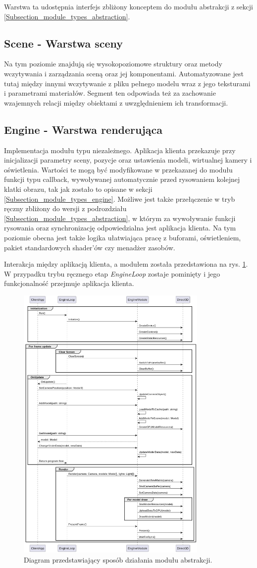 Warstwa ta udostępnia interfejs zbliżony konceptem do modułu abstrakcji z sekcji \ref{Subsection_module_types_abstraction}. 

\subsection{\textbf{Scene} - Warstwa sceny}
Na tym poziomie znajdują się wysokopoziomowe struktury oraz metody wczytywania i zarządzania sceną oraz jej komponentami. Automatyzowane jest tutaj między innymi wczytywanie z pliku pełnego modelu wraz z jego teksturami i parametrami materiałów. Segment ten odpowiada też za zachowanie wzajemnych relacji między obiektami z uwzględnieniem ich transformacji.

\subsection{\textbf{Engine} - Warstwa renderująca}
Implementacja modułu typu niezależnego. Aplikacja klienta przekazuje przy inicjalizacji parametry sceny, pozycje oraz ustawienia modeli, wirtualnej kamery i oświetlenia. Wartości te mogą być modyfikowane w przekazanej do modułu funkcji typu callback, wywoływanej automatycznie przed rysowaniem kolejnej klatki obrazu, tak jak zostało to opisane w sekcji \ref{Subsection_module_types_engine}. Możliwe jest także przełączenie w tryb ręczny zbliżony do wersji z podrozdziału \ref{Subsection_module_types_abstraction}, w którym za wywoływanie funkcji rysowania oraz synchronizację odpowiedzialna jest aplikacja klienta. Na tym poziomie obecna jest także logika ułatwiająca pracę z buforami, oświetleniem, pakiet standardowych shader'ów czy menadżer zasobów.

Interakcja między aplikacją klienta, a modułem została przedstawiona na rys. \ref{UML_Sequence_Module_Final}. W przypadku trybu ręcznego etap \textit{EngineLoop} zostaje pominięty i jego funkcjonalność przejmuje aplikacja klienta.

\begin{figure}[ht!]
	\centering
	\includegraphics[width=350px]{uml/module_type_final.png}
	\caption{Diagram przedstawiający sposób działania modułu abstrakcji.}
	\label{UML_Sequence_Module_Final}
\end{figure}